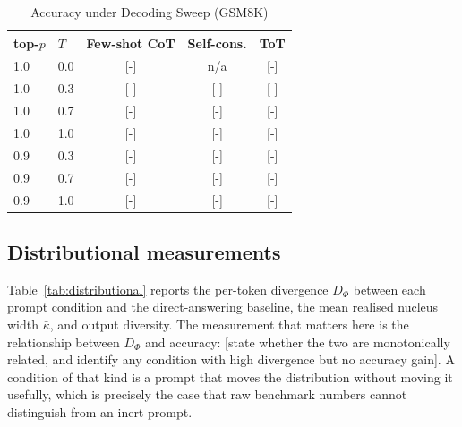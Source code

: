 \documentclass[conference]{IEEEtran}
\begin{document}
\begin{table}[htbp]
\caption{Accuracy under Decoding Sweep (GSM8K)}
\centering
\small
\begin{tabular}{llccc}
\toprule
\textbf{top-$p$} & \textbf{$T$} & \textbf{Few-shot CoT} & \textbf{Self-cons.} & \textbf{ToT} \\
\midrule
1.0 & 0.0 & \textcolor{BrickRed}{[-]} & n/a & \textcolor{BrickRed}{[-]} \\
1.0 & 0.3 & \textcolor{BrickRed}{[-]} & \textcolor{BrickRed}{[-]} & \textcolor{BrickRed}{[-]} \\
1.0 & 0.7 & \textcolor{BrickRed}{[-]} & \textcolor{BrickRed}{[-]} & \textcolor{BrickRed}{[-]} \\
1.0 & 1.0 & \textcolor{BrickRed}{[-]} & \textcolor{BrickRed}{[-]} & \textcolor{BrickRed}{[-]} \\
0.9 & 0.3 & \textcolor{BrickRed}{[-]} & \textcolor{BrickRed}{[-]} & \textcolor{BrickRed}{[-]} \\
0.9 & 0.7 & \textcolor{BrickRed}{[-]} & \textcolor{BrickRed}{[-]} & \textcolor{BrickRed}{[-]} \\
0.9 & 1.0 & \textcolor{BrickRed}{[-]} & \textcolor{BrickRed}{[-]} & \textcolor{BrickRed}{[-]} \\
\bottomrule
\end{tabular}
\label{tab:decoding-sweep}
\end{table}

\subsection{Distributional measurements}
\label{sec:distributional}

Table~\ref{tab:distributional} reports the per-token divergence $D_{\Phi}$ between each prompt condition and the direct-answering baseline, the mean realised nucleus width $\bar{\kappa}$, and output diversity. The measurement that matters here is the relationship between $D_{\Phi}$ and accuracy: \textcolor{BrickRed}{[state whether the two are monotonically related, and identify any condition with high divergence but no accuracy gain]}. A condition of that kind is a prompt that moves the distribution without moving it usefully, which is precisely the case that raw benchmark numbers cannot distinguish from an inert prompt.
\end{document}
